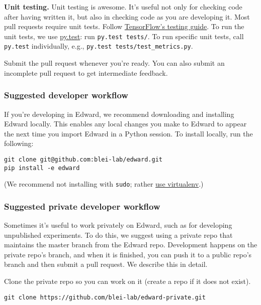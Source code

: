 \textbf{Unit testing.}
Unit testing is awesome. It's useful not only
for checking code after having written it, but also in checking code
as you are developing it.
Most pull requests require unit tests.
Follow
\href{https://www.tensorflow.org/versions/master/api_docs/python/test.html}
{TensorFlow's testing guide}.
To run the unit tests, we use
\href{http://doc.pytest.org/}{py.test}:
run \texttt{py.test tests/}.
To run specific unit tests, call \texttt{py.test} individually, e.g., \texttt{py.test tests/test_metrics.py}.

Submit the pull request whenever you're ready. You can also submit an
incomplete pull request to get intermediate feedback.

\subsubsection{Suggested developer workflow}\label{suggested-workflow}

If you're developing in Edward,
we recommend downloading and installing Edward locally. This enables
any local changes you make to Edward to appear the next time you
import Edward in a Python session. To install locally, run the
following:

\begin{verbatim}
git clone git@github.com:blei-lab/edward.git
pip install -e edward
\end{verbatim}

(We recommend not installing with \texttt{sudo}; rather
\href{http://docs.python-guide.org/en/latest/starting/install/osx/}{use
virtualenv}.)

\subsubsection{Suggested private developer workflow}
\label{suggested-private-workflow}

Sometimes it's useful to work privately on Edward, such as for
developing unpublished experiments.
To do this, we suggest using a private repo
that maintains the master branch from the Edward repo. Development
happens on the private repo's branch, and when it is finished, you can
push it to a public repo's branch and then submit a pull request. We
describe this in detail.

Clone the private repo so you can work on it (create a repo if it does
not exist).

\begin{lstlisting}[class=JSON]
git clone https://github.com/blei-lab/edward-private.git
\end{lstlisting}

